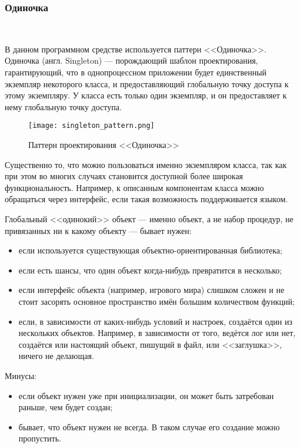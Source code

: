 \subsubsection{Одиночка}
\

В данном программном средстве используется паттерн <<Одиночка>>.
Одиночка (англ. Singleton) — порождающий шаблон проектирования, гарантирующий, что в однопроцессном приложении будет единственный экземпляр некоторого класса, и предоставляющий глобальную точку доступа к этому экземпляру. У класса есть только один экземпляр, и он предоставляет к нему глобальную точку доступа. 

\begin{figure}[ht]
\centering
    \texttt{[image: singleton\_pattern.png]}
    \caption{Паттерн проектирования <<Одиночка>>}
    \label{sec:modeling:singleton}
\end{figure}

Существенно то, что можно пользоваться именно экземпляром класса, так как при этом во многих случаях становится доступной более широкая функциональность. Например, к описанным компонентам класса можно обращаться через интерфейс, если такая возможность поддерживается языком.

Глобальный <<одинокий>> объект — именно объект, а не набор процедур, не привязанных ни к какому объекту — бывает нужен:

\begin{itemize}
    \item если используется существующая объектно-ориентированная библиотека;
    \item если есть шансы, что один объект когда-нибудь превратится в несколько;
    \item если интерфейс объекта (например, игрового мира) слишком сложен и не стоит засорять основное пространство имён большим количеством функций;
    \item если, в зависимости от каких-нибудь условий и настроек, создаётся один из нескольких объектов. Например, в зависимости от того, ведётся лог или нет, создаётся или настоящий объект, пишущий в файл, или <<заглушка>>, ничего не делающая.
\end{itemize}

Минусы:
\begin{itemize}
    \item если объект нужен уже при инициализации, он может быть затребован раньше, чем будет создан;
    \item бывает, что объект нужен не всегда. В таком случае его создание можно пропустить.
\end{itemize}

